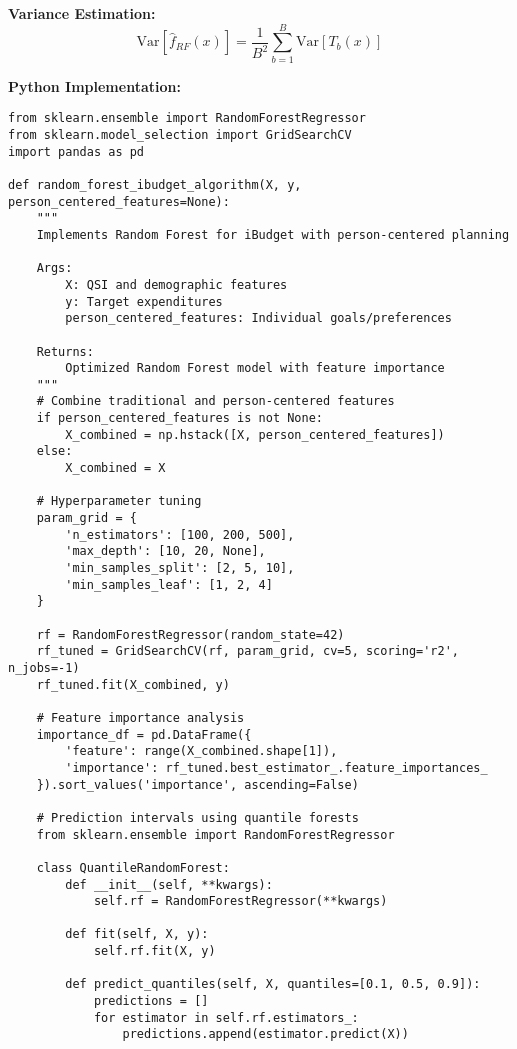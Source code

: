 \textbf{Variance Estimation:}
\begin{equation}
\text{Var}[\hat{f}_{RF}(x)] = \frac{1}{B^2}\sum_{b=1}^{B}\text{Var}[T_b(x)]
\end{equation}

\textbf{Python Implementation:}
\begin{lstlisting}
from sklearn.ensemble import RandomForestRegressor
from sklearn.model_selection import GridSearchCV
import pandas as pd

def random_forest_ibudget_algorithm(X, y, person_centered_features=None):
    """
    Implements Random Forest for iBudget with person-centered planning
    
    Args:
        X: QSI and demographic features
        y: Target expenditures
        person_centered_features: Individual goals/preferences
    
    Returns:
        Optimized Random Forest model with feature importance
    """
    # Combine traditional and person-centered features
    if person_centered_features is not None:
        X_combined = np.hstack([X, person_centered_features])
    else:
        X_combined = X
    
    # Hyperparameter tuning
    param_grid = {
        'n_estimators': [100, 200, 500],
        'max_depth': [10, 20, None],
        'min_samples_split': [2, 5, 10],
        'min_samples_leaf': [1, 2, 4]
    }
    
    rf = RandomForestRegressor(random_state=42)
    rf_tuned = GridSearchCV(rf, param_grid, cv=5, scoring='r2', n_jobs=-1)
    rf_tuned.fit(X_combined, y)
    
    # Feature importance analysis
    importance_df = pd.DataFrame({
        'feature': range(X_combined.shape[1]),
        'importance': rf_tuned.best_estimator_.feature_importances_
    }).sort_values('importance', ascending=False)
    
    # Prediction intervals using quantile forests
    from sklearn.ensemble import RandomForestRegressor
    
    class QuantileRandomForest:
        def __init__(self, **kwargs):
            self.rf = RandomForestRegressor(**kwargs)
            
        def fit(self, X, y):
            self.rf.fit(X, y)
            
        def predict_quantiles(self, X, quantiles=[0.1, 0.5, 0.9]):
            predictions = []
            for estimator in self.rf.estimators_:
                predictions.append(estimator.predict(X))
            

\end{lstlisting}
